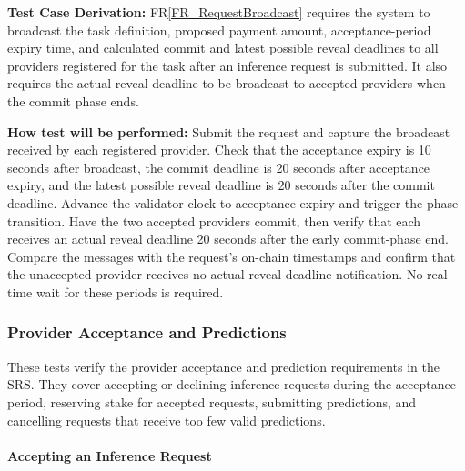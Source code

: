 \documentclass[12pt]{article}
\newcommand{\rref}[1]{FR\ref{#1}}
\begin{document}
\begin{enumerate}
\textbf{Test Case Derivation:} \rref{FR_RequestBroadcast} requires the system to
broadcast the task definition, proposed payment amount, acceptance-period
expiry time, and calculated commit and latest possible reveal deadlines to all
providers registered for the task after an inference request is submitted. It
also requires the actual reveal deadline to be broadcast to accepted providers
when the commit phase ends.

\textbf{How test will be performed:} Submit the request and capture the
broadcast received by each registered provider. Check that the acceptance
expiry is 10 seconds after broadcast, the commit deadline is 20 seconds after
acceptance expiry, and the latest possible reveal deadline is 20 seconds after
the commit deadline. Advance the validator clock to acceptance expiry and
trigger the phase transition. Have the two accepted providers commit, then
verify that each receives an actual reveal deadline 20 seconds after the
early commit-phase end. Compare the messages with the request's on-chain
timestamps and confirm that the unaccepted provider receives no actual reveal
deadline notification. No real-time wait for these periods is required.

\end{enumerate}


\subsubsection{Provider Acceptance and Predictions}

These tests verify the provider acceptance and prediction requirements in the SRS. They cover accepting or
declining inference requests during the acceptance period, reserving stake for accepted requests, submitting
predictions, and cancelling requests that receive too few valid predictions.

\paragraph{Accepting an Inference Request}
\end{document}
